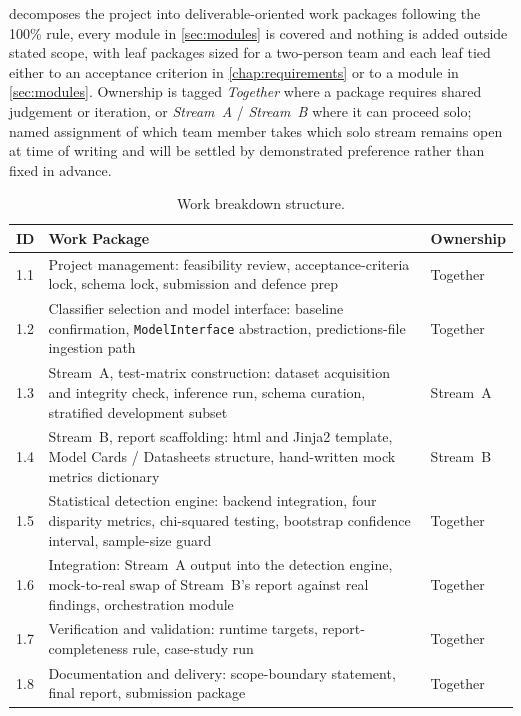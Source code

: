  decomposes the project into deliverable-oriented work packages following the 100\% rule, every module in \cref{sec:modules} is covered and nothing is added outside stated scope, with leaf packages sized for a two-person team and each leaf tied either to an acceptance criterion in \cref{chap:requirements} or to a module in \cref{sec:modules}. Ownership is tagged \emph{Together} where a package requires shared judgement or iteration, or \emph{Stream~A} / \emph{Stream~B} where it can proceed solo; named assignment of which team member takes which solo stream remains open at time of writing and will be settled by demonstrated preference rather than fixed in advance.

\begin{table}[htbp]
    \centering
    \caption{Work breakdown structure.}
    \label{tab:wbs}
    \begin{tabular}{p{0.9cm}p{6.4cm}p{2.2cm}}
        \toprule
        \textbf{ID} & \textbf{Work Package} & \textbf{Ownership} \\
        \midrule
        1.1 & Project management: feasibility review, acceptance-criteria lock, schema lock, submission and defence prep & Together \\
        1.2 & Classifier selection and model interface: baseline confirmation, \texttt{ModelInterface} abstraction, predictions-file ingestion path & Together \\
        1.3 & Stream~A, test-matrix construction: dataset acquisition and integrity check, inference run, schema curation, stratified development subset & Stream~A \\
        1.4 & Stream~B, report scaffolding: \gls{html} and Jinja2 template, Model Cards / Datasheets structure, hand-written mock metrics dictionary & Stream~B \\
        1.5 & Statistical detection engine: backend integration, four disparity metrics, chi-squared testing, bootstrap confidence interval, sample-size guard & Together \\
        1.6 & Integration: Stream~A output into the detection engine, mock-to-real swap of Stream~B's report against real findings, orchestration module & Together \\
        1.7 & Verification and validation: runtime targets, report-completeness rule, case-study run & Together \\
        1.8 & Documentation and delivery: scope-boundary statement, final report, submission package & Together \\
        \bottomrule
    \end{tabular}
\end{table}

